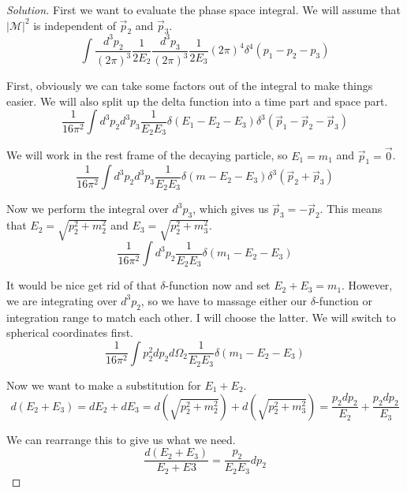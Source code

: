 \documentclass[12pt]{article}
\newenvironment{solution}{\begin{proof}[Solution]}{\end{proof}}
\begin{document}
\begin{solution}

First we want to evaluate the phase space integral. We will assume that $|\mathcal{M}|^2$ is independent of $\vec{p}_2$ and $\vec{p}_3$.
\begin{equation*}
    \int\frac{d^3p_2}{(2\pi)^3}\frac{1}{2E_2}\frac{d^3p_3}{(2\pi)^3}\frac{1}{2E_3}(2\pi)^4\delta^4(p_1-p_2-p_3)
\end{equation*}

First, obviously we can take some factors out of the integral to make things easier. We will also split up the delta function into a time part and space part.
\begin{equation*}
    \frac{1}{16\pi^2}\int d^3p_2 d^3p_3 \frac{1}{E_2 E_3}\delta(E_1-E_2-E_3)\delta^3(\vec{p}_1-\vec{p}_2-\vec{p}_3)
\end{equation*}

We will work in the rest frame of the decaying particle, so $E_1=m_1$ and $\vec{p}_1=\vec{0}$.
\begin{equation*}
    \frac{1}{16\pi^2}\int d^3p_2 d^3p_3 \frac{1}{E_2 E_3}\delta(m-E_2-E_3)\delta^3(\vec{p}_2+\vec{p}_3)
\end{equation*}

Now we perform the integral over $d^3p_3$, which gives us $\vec{p}_3=-\vec{p}_2$. This means that $E_2=\sqrt{p_2^2+m_2^2}$ and $E_3=\sqrt{p_2^2+m_3^2}$.
\begin{equation*}
    \frac{1}{16\pi^2}\int d^3p_2 \frac{1}{E_2 E_3}\delta(m_1-E_2-E_3)
\end{equation*}

It would be nice get rid of that $\delta$-function now and set $E_2+E_3=m_1$. However, we are integrating over $d^3p_2$, so we have to massage either our $\delta$-function or integration range to match each other. I will choose the latter. We will switch to spherical coordinates first.
\begin{equation*}
    \frac{1}{16\pi^2}\int p_2^2dp_2d\Omega_2 \frac{1}{E_2 E_3}\delta(m_1-E_2-E_3)
\end{equation*}

Now we want to make a substitution for $E_1+E_2$.
\begin{equation*}
    d(E_2+E_3)=dE_2+dE_3=d\left(\sqrt{p_2^2+m_2^2}\right)+d\left(\sqrt{p_2^2+m_3^2}\right)=\frac{p_2dp_2}{E_2}+\frac{p_2dp_2}{E_3}
\end{equation*}

We can rearrange this to give us what we need.
\begin{equation*}
    \frac{d(E_2+E_3)}{E_2+E3}=\frac{p_2}{E_2E_3}dp_2
\end{equation*}


\end{solution}
\end{document}
